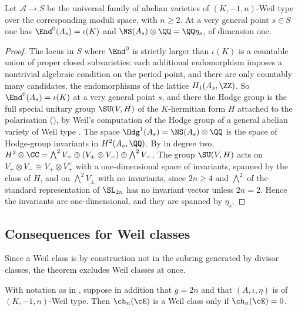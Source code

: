\begin{lemma}\label{lem:genericNS}
Let $\mathcal{A}\to S$ be the universal family of abelian varieties of
$(K,-1,n)$-Weil type over the corresponding moduli space, with $n\ge2$. At a
very general point $s\in S$ one has $\End^{0}(A_{s})=\iota(K)$ and
$\NS(A_{s})\otimes\QQ=\QQ\eta_{s}$, of dimension one.
\end{lemma}

\begin{proof}
The locus in $S$ where $\End^{0}$ is strictly larger than $\iota(K)$ is a
countable union of proper closed subvarieties: each additional endomorphism
imposes a nontrivial algebraic condition on the period point, and there are
only countably many candidates, the endomorphisms of the lattice
$H_{1}(A_{s},\ZZ)$. So $\End^{0}(A_{s})=\iota(K)$ at a very general point
$s$, and there the Hodge group is the full special unitary group
$\SU(V,H)$ of the $K$-hermitian form $H$ attached to the
polarisation (), by Weil's computation of the Hodge group of a general abelian
variety of Weil type \cite{Weil77}. The space
$\Hdg^{1}(A_{s})=\NS(A_{s})\otimes\QQ$ is the space of Hodge-group invariants
in $H^{2}(A_{s},\QQ)$. By  in degree two,
$H^{2}\otimes\CC=\bigwedge^{2}V_{+}\oplus(V_{+}\otimes V_{-})\oplus\bigwedge^{2}V_{-}$.
The group $\SU(V,H)$ acts on $V_{+}\otimes V_{-}\cong V_{+}\otimes V_{+}^{\vee}$
with a one-dimensional space of invariants, spanned by the class of $H$, and on
$\bigwedge^{2}V_{\pm}$ with no invariants, since $2n\ge4$ and $\bigwedge^{2}$
of the standard representation of $\SL_{2n}$ has no invariant vector
unless $2n=2$. Hence the invariants are one-dimensional, and they are spanned
by $\eta_{s}$.
\end{proof}

\subsection{Consequences for Weil classes}

Since a Weil class is by construction not in the subring generated by divisor
classes, the theorem excludes Weil classes at once.

\begin{corollary}\label{cor:neverweil}
With notation as in , suppose in addition that $g=2n$ and
that $(A,\iota,\eta)$ is of $(K,-1,n)$-Weil type. Then $\ch_{n}(\cE)$ is a
Weil class only if $\ch_{n}(\cE)=0$.
\end{corollary}

